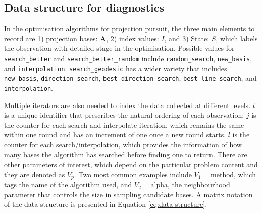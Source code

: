 \documentclass[12pt]{article}
\begin{document}
\hypertarget{data-structure-for-diagnostics}{%
\subsection{Data structure for diagnostics}\label{data-structure-for-diagnostics}}

In the optimisation algorithms for projection pursuit, the three main elements to record are 1) projection bases: \(\mathbf{A}\), 2) index values: \(I\), and 3) State: \(S\), which labels the observation with detailed stage in the optimisation. Possible values for \texttt{search\_better} and \texttt{search\_better\_random} include \texttt{random\_search}, \texttt{new\_basis}, and \texttt{interpolation}. \texttt{search\_geodesic} has a wider variety that includes \texttt{new\_basis}, \texttt{direction\_search}, \texttt{best\_direction\_search}, \texttt{best\_line\_search}, and \texttt{interpolation}.

Multiple iterators are also needed to index the data collected at different levels. \(t\) is a unique identifier that prescribes the natural ordering of each observation; \(j\) is the counter for each search-and-interpolate iteration, which remains the same within one round and has an increment of one once a new round starts. \(l\) is the counter for each search/interpolation, which provides the information of how many bases the algorithm has searched before finding one to return. There are other parameters of interest, which depend on the particular problem content and they are denoted as \emph{\(V_{p}\)}. Two most common examples include \(V_1 = \text{method}\), which tags the name of the algorithm used, and \(V_2 = \text{alpha}\), the neighbourhood parameter that controls the size in sampling candidate bases. A matrix notation of the data structure is presented in Equation \ref{eq:data-structure}.
\end{document}
